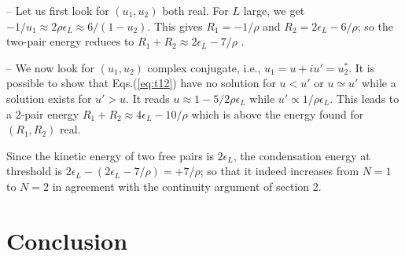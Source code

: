 \documentclass[5p,twocolumn]{elsarticle}
\begin{document}
-- Let us first look for $(u_1,u_2)$ both real. For $L$ large, we get $-1/u_1\approx 2 \rho\epsilon_L \approx 6/(1-u_2)$. This gives $R_1=-1/\rho$ and $R_2=2 \epsilon_L-6/\rho$; so the two-pair energy reduces to $R_1+R_2\approx2 \epsilon_L-7/\rho$ .

--  We now look for $(u_1,u_2)$ complex conjugate, i.e., $u_1=u+iu'=u^*_2$. It is possible to show that Eqs.(\ref{eq:t12}) have no solution for $u<u'$ or $u\simeq u'$ while a solution exists for $u'>u$. It reads $u\approx1-5/2\rho\epsilon_L$ while $u'\propto1/\rho\epsilon_L$. This leads to a 2-pair energy $R_1+R_2\approx4 \epsilon_L-10/\rho$ which is above the energy found for $(R_1,R_2)$ real.

Since the kinetic energy of two free pairs is $2\epsilon_L$, the condensation energy at threshold is 
$ 2\epsilon_L-(2 \epsilon_L-7/\rho)=+7/\rho$; so that it indeed increases from $N=1$ to $N=2$ in agreement with the continuity argument of section 2.

 

\section{Conclusion\label{sec:conclusion}}



\end{document}

